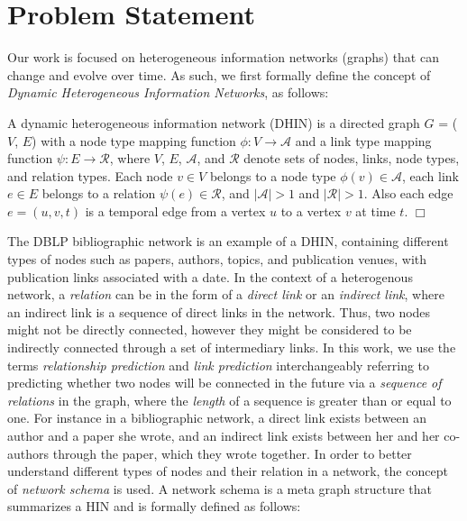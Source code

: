 \section{Problem Statement}


Our work is focused on heterogeneous information networks (graphs) that can change and evolve over time. As such, we first formally define the concept of \textit{Dynamic Heterogeneous Information Networks}, as follows:


\begin{definition} A dynamic heterogeneous information network (DHIN) is a directed graph $G$ = ($V$, $E$) with a node type mapping function $\phi: V \rightarrow \mathcal{A}$ and a link type mapping function $\psi: E \rightarrow \mathcal{R}$, where $V$, $E$, $\mathcal{A}$, and $\mathcal{R}$ denote sets of nodes, links, node types, and relation types. Each node $v \in V$ belongs to a node type $\phi(v) \in \mathcal{A}$, each link $e \in E$ belongs to a relation $\psi(e) \in \mathcal{R}$, and $|\mathcal{A}| > 1$ and $|\mathcal{R}| > 1$. Also each edge $e = (u, v, t)$ is a temporal edge from a vertex $u$ to a vertex $v$ at time $t$. $\Box$ \end{definition}

The DBLP bibliographic network %
is an example of a DHIN, containing different types of nodes such as papers, authors, topics, and publication venues, with publication links associated with a date. %
In the context of a heterogenous network, a \textit{relation} can be in the form of a \textit{direct link} or an \textit{indirect link}, where an indirect link is a sequence of direct links in the network. Thus, two nodes might not be directly connected, however they might be considered to be indirectly connected through a set of intermediary links. In this work, we use the terms \textit{relationship prediction} and \textit{link prediction} interchangeably referring to predicting whether two nodes will be connected in the future via a \textit{sequence of relations} in the graph, where the \textit{length} of a sequence is greater than or equal to one. For instance in a bibliographic network, a direct link exists between an author and a paper she wrote, and an indirect link exists between her and her co-authors through the paper, which they wrote together. In order to better understand different types of nodes and their relation in a network, the concept of \textit{network schema} \cite{sun2011pathsim} is used. A network schema is a meta graph structure that summarizes a HIN and is formally defined as follows:

